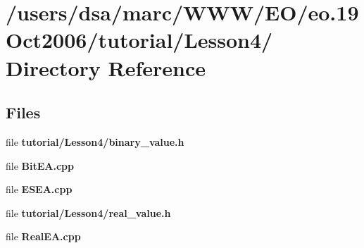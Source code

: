 \section{/users/dsa/marc/WWW/EO/eo.19Oct2006/tutorial/Lesson4/ Directory Reference}
\label{dir_000006}
\subsection*{Files}
\begin{CompactItemize}
\item 
file {\bf tutorial/Lesson4/binary_value.h}
\item 
file {\bf BitEA.cpp}
\item 
file {\bf ESEA.cpp}
\item 
file {\bf tutorial/Lesson4/real_value.h}
\item 
file {\bf RealEA.cpp}
\end{CompactItemize}
